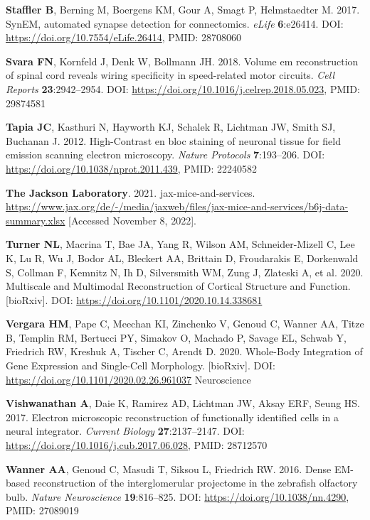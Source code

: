 \documentclass{article}
\newenvironment{reflist}{\par\small\setlength{\parindent}{0pt}\everypar{\hangindent=2.2em\hangafter=1}}{\par}
\begin{document}
\begin{reflist}
\textbf{Staffler B}, Berning M, Boergens KM, Gour A, Smagt P, Helmstaedter M. 2017. SynEM, automated synapse detection for connectomics. \emph{eLife} \textbf{6}:e26414. DOI: \url{https://doi.org/10.7554/eLife.26414}, PMID: 28708060

\textbf{Svara FN}, Kornfeld J, Denk W, Bollmann JH. 2018. Volume em reconstruction of spinal cord reveals wiring specificity in speed-related motor circuits. \emph{Cell Reports} \textbf{23}:2942–2954. DOI: \url{https://doi.org/10.1016/j.celrep.2018.05.023}, PMID: 29874581

\textbf{Tapia JC}, Kasthuri N, Hayworth KJ, Schalek R, Lichtman JW, Smith SJ, Buchanan J. 2012. High-Contrast en bloc staining of neuronal tissue for field emission scanning electron microscopy. \emph{Nature Protocols} \textbf{7}:193–206. DOI: \url{https://doi.org/10.1038/nprot.2011.439}, PMID: 22240582

\textbf{The Jackson Laboratory}. 2021. jax-mice-and-services. \url{https://www.jax.org/de/-/media/jaxweb/files/jax-mice-and-services/b6j-data-summary.xlsx} [Accessed November 8, 2022].

\textbf{Turner NL}, Macrina T, Bae JA, Yang R, Wilson AM, Schneider-Mizell C, Lee K, Lu R, Wu J, Bodor AL, Bleckert AA, Brittain D, Froudarakis E, Dorkenwald S, Collman F, Kemnitz N, Ih D, Silversmith WM, Zung J, Zlateski A, et al. 2020. Multiscale and Multimodal Reconstruction of Cortical Structure and Function. [bioRxiv]. DOI: \url{https://doi.org/10.1101/2020.10.14.338681}

\textbf{Vergara HM}, Pape C, Meechan KI, Zinchenko V, Genoud C, Wanner AA, Titze B, Templin RM, Bertucci PY, Simakov O, Machado P, Savage EL, Schwab Y, Friedrich RW, Kreshuk A, Tischer C, Arendt D. 2020. Whole-Body Integration of Gene Expression and Single-Cell Morphology. [bioRxiv]. DOI: \url{https://doi.org/10.1101/2020.02.26.961037} Neuroscience

\textbf{Vishwanathan A}, Daie K, Ramirez AD, Lichtman JW, Aksay ERF, Seung HS. 2017. Electron microscopic reconstruction of functionally identified cells in a neural integrator. \emph{Current Biology} \textbf{27}:2137–2147. DOI: \url{https://doi.org/10.1016/j.cub.2017.06.028}, PMID: 28712570

\textbf{Wanner AA}, Genoud C, Masudi T, Siksou L, Friedrich RW. 2016. Dense EM-based reconstruction of the interglomerular projectome in the zebrafish olfactory bulb. \emph{Nature Neuroscience} \textbf{19}:816–825. DOI: \url{https://doi.org/10.1038/nn.4290}, PMID: 27089019


\end{reflist}
\end{document}
